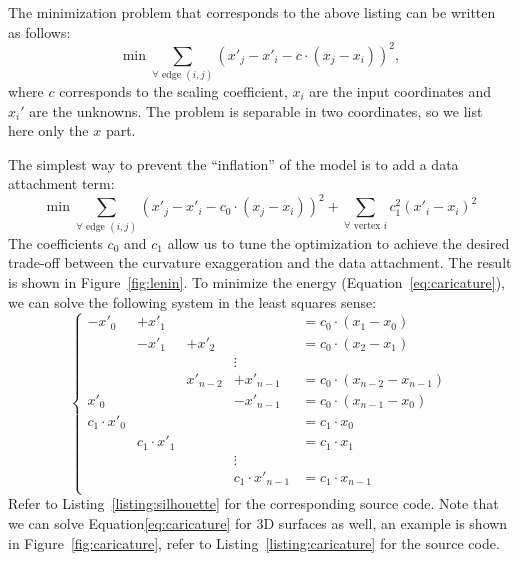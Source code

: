 \documentclass[notitlepage,oneside]{book}
\begin{document}
The minimization problem that corresponds to the above listing can be written as follows:
\begin{equation}
\label{eq:lenin}
\min \sum\limits_{\forall \text{~edge~} (i,j)} \left(x'_j - x'_i -  c\cdot\left(x_j - x_i\right)  \right)^2,
\end{equation}
where $c$ corresponds to the scaling coefficient, $x_i$ are the input coordinates and $x_i'$ are the unknowns.
The problem is separable in two coordinates, so we list here only the $x$ part.

The simplest way to prevent the ``inflation'' of the model is to add a data attachment term:
\begin{equation}
\label{eq:caricature}
\min \sum\limits_{\forall \text{~edge~} (i,j)} \left(x'_j - x'_i -  c_0\cdot\left(x_j - x_i\right)  \right)^2 + \sum\limits_{\forall \text{~vertex~} i} c_1^2 \left( x'_i - x_i \right)^2
\end{equation}
The coefficients $c_0$ and $c_1$ allow us to tune the optimization to achieve the desired trade-off between the curvature exaggeration and the data attachment.
The result is shown in Figure~\ref{fig:lenin}.
To minimize the energy (Equation~\eqref{eq:caricature}), we can solve the following system in the least squares sense:
\begin{equation}
\label{eq:carsyst}
\left \{ \begin{array}{ccccl}
-x'_0 & + x'_1      &       &               & =  c_0\cdot \left( x_1 - x_0\right)  \\
     & - x'_1      & +x'_2      &           & =  c_0 \cdot \left(x_2 - x_1\right)  \\
    &       &       & \vdots    &             \\
    &            & x'_{n-2}   &    +x'_{n-1}       & =  c_0 \cdot \left(x_{n-2} - x_{n-1}\right)  \\
x'_0 &            &    &    -x'_{n-1}       & =  c_0 \cdot \left(x_{n-1} - x_0\right)  \\
c_1\cdot x'_0 &            &       &               & =  c_1\cdot x_0  \\
& c_1\cdot x'_1            &       &               & =  c_1\cdot x_1  \\
    &       &       & \vdots    &             \\
&             &       &    c_1\cdot x'_{n-1}           & =  c_1\cdot x_{n-1}  \\
\end{array} \right.
\end{equation}
Refer to Listing~\ref{listing:silhouette} for the corresponding source code. Note that we can solve Equation\eqref{eq:caricature} for 3D surfaces as well, an example is shown in Figure~\ref{fig:caricature},
refer to Listing~\ref{listing:caricature} for the source code.
\end{document}
